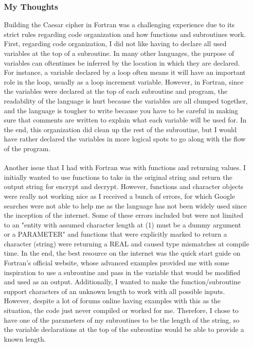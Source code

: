 \documentclass[letterpaper, 10pt, DIV=13]{scrartcl}
\numberwithin{equation}{section}
\numberwithin{figure}{section}
\numberwithin{table}{section}
\begin{document}
\subsubsection{My Thoughts}
Building the Caesar cipher in Fortran was a challenging experience due to its strict rules regarding code organization and how functions and subroutines work. First, regarding code organization, I did not like having to declare all used variables at the top of a subroutine. In many other languages, the purpose of variables can oftentimes be inferred by the location in which they are declared. For instance, a variable declared by a loop often means it will have an important role in the loop, usually as a loop increment variable. However, in Fortran, since the variables were declared at the top of each subroutine and program, the readability of the language is hurt because the variables are all clumped together, and the language is tougher to write because you have to be careful in making sure that comments are written to explain what each variable will be used for. In the end, this organization did clean up the rest of the subroutine, but I would have rather declared the variables in more logical spots to go along with the flow of the program.
\\ \\
Another issue that I had with Fortran was with functions and returning values. I initially wanted to use functions to take in the original string and return the output string for encrypt and decrypt. However, functions and character objects were really not working nice as I received a bunch of errors, for which Google searches were not able to help me as the language has not been widely used since the inception of the internet. Some of these errors included but were not limited to an "entity with assumed character length at (1) must be a dummy argument or a PARAMETER" and functions that were explicitly marked to return a character (string) were returning a REAL and caused type mismatches at compile time. In the end, the best resource on the internet was the quick start guide on Fortran's official website, whose advanced examples provided me with some inspiration to use a subroutine and pass in the variable that would be modified and used as an output. Additionally, I wanted to make the function/subroutine support characters of an unknown length to work with all possible inputs. However, despite a lot of forums online having examples with this as the situation, the code just never compiled or worked for me. Therefore, I chose to have one of the parameters of my subroutines to be the length of the string, so the variable declarations at the top of the subroutine would be able to provide a known length.
\end{document}
